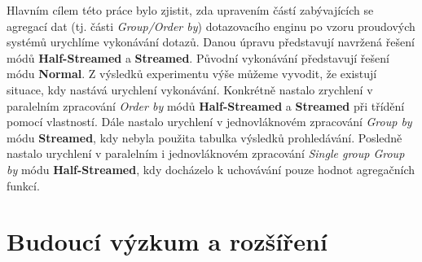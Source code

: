 Hlavním cílem této práce bylo zjistit, zda upravením částí zabývajících se agregací dat (tj. části  \textit{Group/Order by}) dotazovacího enginu po vzoru proudových systémů urychlíme vykonávání dotazů.
Danou úpravu představují navržená řešení módů \textbf{Half-Streamed} a \textbf{Streamed}.
Původní vykonávání představují řešení módu \textbf{Normal}.
Z výsledků experimentu výše můžeme vyvodit, že existují situace, kdy nastává urychlení vykonávání.
Konkrétně nastalo zrychlení v paralelním zpracování \textit{Order by} módů \textbf{Half-Streamed} a \textbf{Streamed} při třídění pomocí vlastností.
Dále nastalo urychlení v jednovláknovém zpracování \textit{Group by} módu \textbf{Streamed}, kdy nebyla použita tabulka výsledků prohledávání.
Posledně nastalo urychlení v paralelním i jednovláknovém zpracování \textit{Single group Group by} módu \textbf{Half-Streamed}, kdy docházelo k uchovávání pouze hodnot agregačních funkcí.

\section*{Budoucí výzkum a rozšíření}

